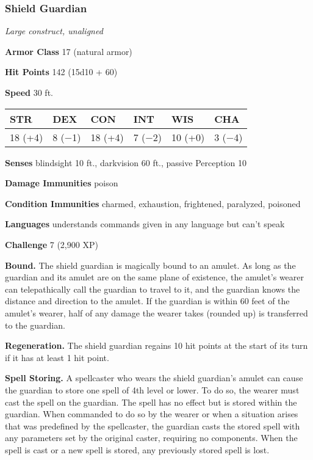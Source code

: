 \documentclass[
]{article}
\begin{document}
\hypertarget{shield-guardian}{%
\subsubsection{Shield Guardian}\label{shield-guardian}}

\emph{Large construct, unaligned}

\textbf{Armor Class} 17 (natural armor)

\textbf{Hit Points} 142 (15d10 + 60)

\textbf{Speed} 30 ft.

\begin{longtable}[]{@{}llllll@{}}
\toprule
STR & DEX & CON & INT & WIS & CHA\tabularnewline
\midrule
\endhead
18 (+4) & 8 (−1) & 18 (+4) & 7 (−2) & 10 (+0) & 3 (−4)\tabularnewline
\bottomrule
\end{longtable}

\textbf{Senses} blindsight 10 ft., darkvision 60 ft., passive Perception
10

\textbf{Damage Immunities} poison

\textbf{Condition Immunities} charmed, exhaustion, frightened,
paralyzed, poisoned

\textbf{Languages} understands commands given in any language but can't
speak

\textbf{Challenge} 7 (2,900 XP)

\textbf{Bound.} The shield guardian is magically bound to an amulet. As
long as the guardian and its amulet are on the same plane of existence,
the amulet's wearer can telepathically call the guardian to travel to
it, and the guardian knows the distance and direction to the amulet. If
the guardian is within 60 feet of the amulet's wearer, half of any
damage the wearer takes (rounded up) is transferred to the guardian.

\textbf{Regeneration.} The shield guardian regains 10 hit points at the
start of its turn if it has at least 1 hit point.

\textbf{Spell Storing.} A spellcaster who wears the shield guardian's
amulet can cause the guardian to store one spell of 4th level or lower.
To do so, the wearer must cast the spell on the guardian. The spell has
no effect but is stored within the guardian. When commanded to do so by
the wearer or when a situation arises that was predefined by the
spellcaster, the guardian casts the stored spell with any parameters set
by the original caster, requiring no components. When the spell is cast
or a new spell is stored, any previously stored spell is lost.
\end{document}
